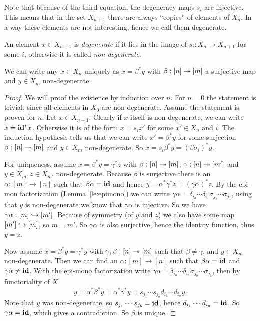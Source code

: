 Note that because of the third equation, the degeneracy maps $s_i$ are injective. This means that in the set $X_{n+1}$ there are always ``copies'' of elements of $X_n$. In a way these elements are not interesting, hence we call them degenerate.
\begin{definition}
	An element $x \in X_{n+1}$ is \emph{degenerate} if it lies in the image of $s_i: X_n \to X_{n+1}$ for some $i$, otherwise it is called \emph{non-degenerate}.
\end{definition}
\begin{lemma}
	\label{le:non-degenerate}
	We can write any $x \in X_n$ uniquely as $x = \beta^\ast y$ with $\beta: [n] \twoheadrightarrow [m]$ a surjective map and $y \in X_m$ non-degenerate.
\end{lemma}
\begin{proof}
	We will proof the existence by induction over $n$. For $n=0$ the statement is trivial, since all elements in $X_0$ are non-degenerate. Assume the statement is proven for $n$. Let $x \in X_{n+1}$. Clearly if $x$ itself is non-degenerate, we can write $x = \mathbf{id}^\ast x$. Otherwise it is of the form $x = s_i x'$ for some $x' \in X_n$ and $i$. The induction hypothesis tells us that we can write $x' = \beta^\ast y$ for some surjection $\beta: [n] \twoheadrightarrow [m]$ and $y \in X_m$ non-degenerate. So $x = s_i \beta^\ast y = (\beta \sigma_i)^\ast y$.

	For uniqueness, assume $x = \beta^\ast y = \gamma^\ast z$ with $\beta: [n] \twoheadrightarrow [m]$, $\gamma: [n] \twoheadrightarrow [m']$ and $y \in X_m, z \in X_{m'}$ non-degenerate. Because $\beta$ is surjective there is an $\alpha:[m]\to[n]$ such that $\beta\alpha = \mathbf{id}$ and hence $y = \alpha^\ast \gamma^\ast z = (\gamma\alpha)^\ast z$. By the epi-mon factorization (Lemma~\ref{le:epimono}) we can write $\gamma\alpha = \delta_{i_a} \cdots \delta_{i_1} \sigma_{j_b} \cdots \sigma_{j_1}$, using that $y$ is non-degenerate we know that $\gamma\alpha$ is injective. So we have $\gamma\alpha: [m] \hookrightarrow [m']$. Because of symmetry (of $y$ and $z$) we also have some map $[m'] \hookrightarrow[m]$, so $m = m'$. So $\gamma\alpha$ is also surjective, hence the identity function, thus $y = z$.

	Now assume $x = \beta^\ast y = \gamma^\ast y$ with $\gamma, \beta: [n] \twoheadrightarrow [m]$ such that $\beta \neq \gamma$, and $y \in X_m$ non-degenerate. Then we can find an $\alpha:[m]\to[n]$ such that $\beta\alpha = \mathbf{id}$ and $\gamma\alpha \neq \mathbf{id}$. With the epi-mono factorization write $\gamma\alpha = \delta_{i_a} \cdots \delta_{i_1} \sigma_{j_b} \cdots \sigma_{j_1}$, then by functoriality of $X$
	$$ y = \alpha^\ast \beta^\ast y = \alpha^\ast \gamma^\ast y = s_{j_1} \cdots s_{j_b} d_{i_1} \cdots d_{i_a} y. $$
	Note that $y$ was non-degenerate, so $s_{j_1} \cdots s_{j_b} = \mathbf{id}$, hence $d_{i_1} \cdots d_{i_a} = \mathbf{id}$. So $\gamma\alpha = \mathbf{id}$, which gives a contradiction. So $\beta$ is unique.
\end{proof}

